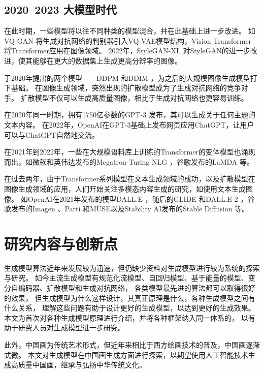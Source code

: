 \subsection{2020--2023 大模型时代}
在此时期，一些模型将以往不同种类的模型混合，并在此基础上进一步改进。
如VQ-GAN {\cite{esser2021taming}}将生成对抗网络的判别器引入VQ-VAE模型结构，Vision Transformer {\cite{dosovitskiy2020image}}将Transformer应用在图像领域。
2022年，StyleGAN-XL {\cite{sauer2022stylegan}}对StyleGAN的进一步改进，使其能够在更大的数据集上生成更高分辨率的图像。

于2020年提出的两个模型——DDPM {\cite{ho2020denoising}}和DDIM {\cite{song2020denoising}}，为之后的大规模图像生成模型打下基础。
在图像生成领域，突然出现的扩散模型成为了生成对抗网络的竞争对手。
扩散模型不仅可以生成高质量图像，相比于生成对抗网络也更容易训练。

在2020年同一时期，拥有1750亿参数的GPT-3 {\cite{brown2020language}}发布，其可以生成关于任何主题的文本内容。
在2022年，OpenAI在GPT-3基础上发布网页应用ChatGPT，让用户可以与ChatGPT自然地交流。

在2021年到2022年，一些在大规模语料库上训练的Transformer的变体模型也涌现而出，如微软和英伟达发布的Megatron-Turing NLG {\cite{smith2022using}}，谷歌发布的LaMDA {\cite{thoppilan2022lamda}}等。

在过去两年，由于Transformer系列模型在文本生成领域的成功，以及扩散模型在图像生成领域的应用，人们开始关注多模态内容生成的研究，如使用文本生成图像。
如OpenAI在2021年发布的模型DALL.E {\cite{ramesh2021zero}}，随后的GLIDE {\cite{nichol2021glide}}和DALL.E 2 {\cite{ramesh2022hierarchical}}，谷歌发布的Imagen {\cite{saharia2022photorealistic}}、Parti {\cite{yu2022scaling}}和MUSE以及Stability AI发布的Stable Diffusion {\cite{rombach2022high}}等。
\section{研究内容与创新点}
生成模型算法近年来发展较为迅速，但仍缺少资料对生成模型进行较为系统的探索与研究。
如今主流生成模型有规范化流模型、自回归模型、基于能量的模型、变分自编码器、扩散模型和生成对抗网络，
各类模型最先进的算法都可以取得很好的效果，
但生成模型为什么这样设计，其真正原理是什么，各种生成模型之间有什么关系，
理解这些问题有助于设计更好的生成模型，以达到更好的生成效果。
本文为首次对各种生成模型原理进行介绍，并将各种框架纳入同一体系的，
以有助于研究人员对生成模型进一步研究。

此外，中国画为传统艺术形式，但近年来相比于西方绘画技术的普及，中国画逐渐式微。
本文对生成模型在中国画生成方面进行探索，以期望使用人工智能技术生成高质量中国画，继承与弘扬中华传统文化。





